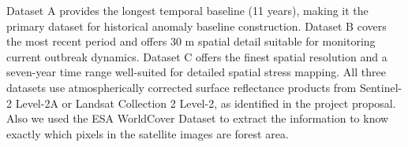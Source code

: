 Dataset A provides the longest temporal baseline (11 years), making it the primary dataset for historical anomaly baseline construction. Dataset B covers the most recent period and offers 30 m spatial detail suitable for monitoring current outbreak dynamics. Dataset C offers the finest spatial resolution and a seven-year time range well-suited for detailed spatial stress mapping. All three datasets use atmospherically corrected surface reflectance products from Sentinel-2 Level-2A or Landsat Collection 2 Level-2, as identified in the project proposal. Also we used the ESA WorldCover Dataset to extract the information to know exactly which pixels in the satellite images are forest area. 